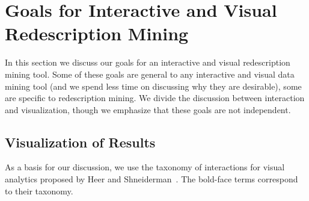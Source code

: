 
\section{Goals for Interactive and Visual Redescription Mining}
\label{sec:goals-inter-visu}

In this section we discuss our goals for an interactive and visual
redescription mining tool. Some of these goals are general to any
interactive and visual data mining tool (and we spend less time on
discussing why they are desirable), some are specific to
redescription mining. We divide the discussion between interaction and
visualization, though we emphasize that these goals are not independent.


\subsection{Visualization of Results}
\label{sec:goals-visualization}
As a basis for our discussion, we use the taxonomy of interactions for
visual analytics proposed by Heer and
Shneiderman~\cite{Heer:2012:IDV:2133806.2133821}. The bold-face terms
correspond to their taxonomy.

